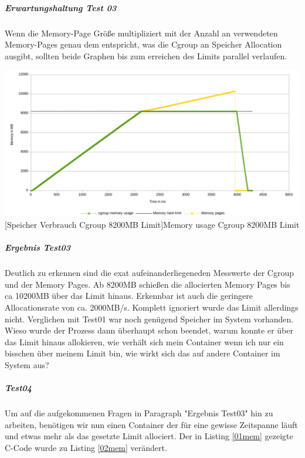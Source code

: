 \subparagraph{Erwartungshaltung Test 03}
Wenn die Memory-Page Größe multipliziert mit der Anzahl an verwendeten Memory-Pages genau dem entspricht, was die Cgroup an Speicher Allocation ausgibt, sollten beide Graphen bis zum erreichen des Limits parallel verlaufen.

\vspace{1em}
\begin{minipage}{\linewidth}
	\centering
	\includegraphics[width=1\linewidth]{pics/003_mem_usage_8200mb_limit_Cgroup_Pages_RDY_FOR_USE.png}
	[Speicher Verbrauch Cgroup 8200MB Limit]{Memory usage Cgroup 8200MB Limit}
	\label{fig:003_mem_usage_8200mb_limit_Cgroup_Pages_RDY_FOR_USE}
\end{minipage}

\subparagraph{Ergebnis Test03}
Deutlich zu erkennen sind die exat aufeinanderliegeneden Messwerte der Cgroup und der Memory Pages. Ab 8200MB schießen die allocierten Memory Pages bis ca 10200MB über das Limit hinaus. Erkennbar ist auch die geringere Allocationsrate von ca. 2000MB/s. Komplett ignoriert wurde das Limit allerdings nicht. Verglichen mit Test01 war noch genügend Speicher im System vorhanden. Wieso wurde der Prozess dann überhaupt schon beendet, warum konnte er über das Limit hinaus allokieren, wie verhält sich mein Container wenn ich nur ein bisschen über meinem Limit bin, wie wirkt sich das auf andere Container im System aus?

\subparagraph{Test04}
Um auf die aufgekommenen Fragen in Paragraph "Ergebnis Test03" hin zu arbeiten, benötigen wir nun einen Container der für eine gewisse Zeitspanne läuft und etwas mehr als das gesetzte Limit allociert. Der in Listing \ref{01mem} gezeigte C-Code wurde zu Listing \ref{02mem} verändert. 

\vspace{1em}


